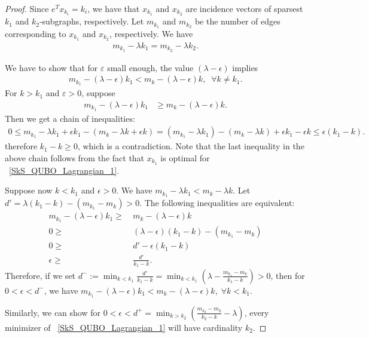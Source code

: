 \documentclass[10pt,a4paper]{amsart}
\begin{document}
\begin{proof}
Since $e^Tx_{k_i}=k_i$, we have that $x_{k_1}$ and $x_{k_2}$  are incidence vectors of  sparsest  $k_1$ and $k_2$-subgraphs, respectively.
 Let $ m_{k_1}$ and  $ m_{k_2}$ be the number of edges corresponding to $x_{k_1}$ and $x_{k_2}$, respectively.
We have 
\begin{align*}
    m_{k_1}-\lambda k_1 =  m_{k_2} -\lambda k_2. 
\end{align*}

We have to show that for $\varepsilon$ small enough, the value $(\lambda-\epsilon)$ implies
\begin{align*}
    m_{k_1} - (\lambda-\epsilon)k_1 < m_{k} - (\lambda-\epsilon)k,\;\; \forall k  \neq k_1.
\end{align*} 
For $k > k_1$ and $\varepsilon >0$, suppose  
\begin{align*}
m_{k_1} - (\lambda-\epsilon)k_1 &\ge  m_{k} - (\lambda-\epsilon)k.
\end{align*}
Then we get a chain  of  inequalities: 
\begin{align*}
0\le 
m_{k_1} - \lambda k_1 + \epsilon k_1 -(  m_{k} - \lambda k + \epsilon k) =
     (m_{k_1} - \lambda k_1) - (m_{k} - \lambda k)+ \epsilon k_1 - \epsilon k \le 
    \epsilon (k_1 - k). 
\end{align*}
therefore $k_1 - k\ge 0$, which is a  
contradiction. Note that the last inequality in the above chain follows from the fact that $x_{k_1}$ is optimal for ~\eqref{SkS_QUBO_Lagrangian_1}.

Suppose  now $k < k_1$ and $\epsilon>0$.
We have $m_{k_1} - \lambda k_1 < m_{k} - \lambda k$. Let $d' = \lambda(k_1-k) - (m_{k_1} - m_k) > 0$. The following  inequalities are equivalent:
\begin{align*}
    m_{k_1} - (\lambda - \epsilon)k_1 \ge & ~m_k - (\lambda - \epsilon)k \\
    0 \ge & ~ (\lambda - \epsilon)(k_1-k) - (m_{k_1} - m_k)\\
    0 \ge & ~ d' - \epsilon(k_1-k)\\
    \epsilon \ge  & ~ \frac{d'}{k_1 - k}.
\end{align*}
Therefore, if we set 
$  d^-:=
 \min_{k<k_1} \frac{d'}{k_1 - k} = \min_{k<k_1} \left( \lambda - \frac{m_{k_1} - m_{k}}{k_1 - k} \right) > 0$, then for $0<\epsilon<d^-$, we have $m_{k_1} - (\lambda-\epsilon)k_1 < m_{k} - (\lambda-\epsilon)k,\; \forall k < k_1$.

Similarly, we can show for $0<\epsilon<d^+=\min_{k>k_2} \left( \frac{m_{k_2} - m_{k}}{k_2 - k} - \lambda \right)$, every minimizer of ~\eqref{SkS_QUBO_Lagrangian_1} will have cardinality $k_2$.
\end{proof}
\end{document}

